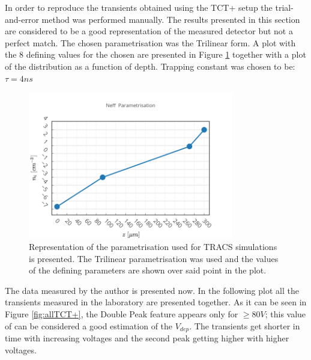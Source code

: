 
In order to reproduce the transients obtained using the TCT+ setup the trial-and-error method was performed manually. The results presented in this section are considered to be a good representation of the measured detector but not a perfect match. The chosen \neff parametrisation was the Trilinear form. A plot with the 8 defining values for the chosen \neff are presented in Figure \ref{fig:TRACSparam} together with a plot of the \neff distribution as a function of depth. Trapping constant was chosen to be: $\tau = 4 ns$

\begin{figure}[H]
	\centering
	\includegraphics[width=0.8\textwidth]{Neff.png}
	\caption{Representation of the \neff parametrisation used for TRACS simulations is presented. The Trilinear parametrisation was used and the values of the defining parameters are shown over said point in the plot.}
	\label{fig:TRACSparam}
\end{figure}

The data measured by the author is presented now. In the following plot all the transients measured in the laboratory are presented together. As it can be seen in Figure \ref{fig:allTCT+}, the Double Peak feature appears only for \vias $ \geq 80 V$; this value of \vias can be considered a good estimation of the $V_{dep}$. The transients get shorter in time with increasing voltages and the second peak getting higher with higher voltages. 


